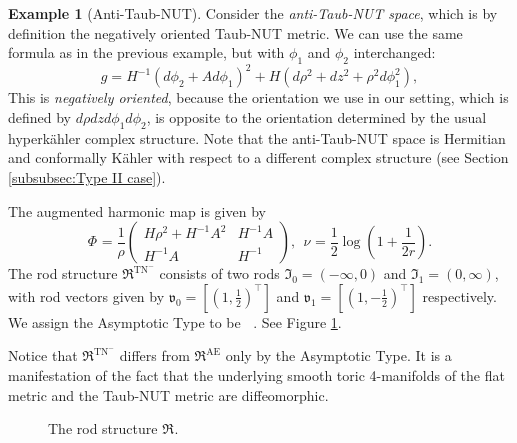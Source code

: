 \documentclass[a4paper,11pt]{amsart}
\theoremstyle{definition}
\newtheorem{example}[theorem]{Example}
\numberwithin{equation}{section}
\newcommand{\mR} {\mathfrak R}
\DeclareMathOperator{\Ae}{AE}
\DeclareMathOperator{\TN}{TN}
\DeclareMathOperator{\TNm}{TN^{--}}
\DeclareMathOperator{\ALFm}{ALF^{--}}
\begin{document}
\begin{example}[Anti-Taub-NUT]\label{example:negative Taub-NUT}
    Consider the \emph{anti-Taub-NUT space}, which is by definition the negatively oriented Taub-NUT metric.   We can use the same formula as in the previous example, but with $\phi_1$ and $\phi_2$ interchanged:
	\begin{equation*}
		g=H^{-1}(d\phi_2+{A}d\phi_1)^2+H(d\rho^2+dz^2+\rho^2d\phi_1^2),
	\end{equation*}
This is \emph{negatively oriented}, because the orientation we use in our setting, which is defined by $d\rho dzd\phi_1d\phi_2$, is opposite to the orientation determined by the usual hyperk\"ahler complex structure. Note that the anti-Taub-NUT space is Hermitian and conformally K\"ahler with respect to a  different complex structure (see Section \ref{subsubsec:Type II case}).
    
    The augmented harmonic map is given by 
    \begin{equation}\Phi^{\TNm}=\frac{1}{\rho}\left(\begin{matrix}H\rho^2+H^{-1}A^2 & H^{-1}A\\ H^{-1}A& H^{-1}\end{matrix}\right), \ \ \nu^{\TNm}=\frac{1}{2}\log(1+\frac{1}{2r}).
    \end{equation}
    The rod structure $\mathfrak{R}^{\TN^{-}}$ consists of two rods $\mathfrak{I}_0=(-\infty,0)$ and $\mathfrak{I}_1=(0,\infty)$, with rod vectors given by  ${\mathfrak{v}}_0=[(1,\frac{1}{2})^{\top}]$ and ${\mathfrak{v}}_1=[(1,-\frac{1}{2})^{\top}]$ respectively. We assign the Asymptotic Type to be $\ALFm$. See Figure \ref{Figure:rod structure for R^TN-}.
    
    Notice that $\mR^{\TN^-}$   differs from $\mR^{\Ae}$ only by the Asymptotic Type. It is a manifestation of the fact that the underlying smooth toric 4-manifolds of the flat metric and the Taub-NUT metric are diffeomorphic. 
    \begin{figure}[ht]
	\caption{The rod structure $\mR^{\TNm}$.}
	\label{Figure:rod structure for R^TN-}   
    \end{figure} 
\end{example}
\end{document}
